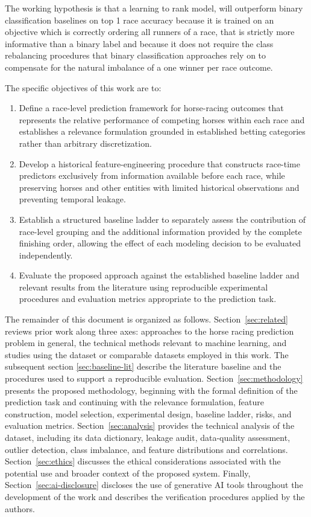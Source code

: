 The working hypothesis is that a learning to rank model, will outperform binary
classification baselines on top 1 race accuracy because it is trained on an objective
which is correctly ordering all runners of a race, that is strictly more informative
than a binary label and because it does not require the class rebalancing procedures
that binary classification approaches rely on to compensate for the natural imbalance
of a one winner per race outcome.

The specific objectives of this work are to:
\begin{enumerate}
    \item Define a race-level prediction framework for horse-racing
    outcomes that represents the relative performance of competing horses
    within each race and establishes a relevance formulation grounded in
    established betting categories rather than arbitrary discretization.

    \item Develop a historical feature-engineering procedure that
    constructs race-time predictors exclusively from information available
    before each race, while preserving horses and other entities with limited
    historical observations and preventing temporal leakage.

    \item Establish a structured baseline ladder to separately assess
    the contribution of race-level grouping and the additional information
    provided by the complete finishing order, allowing the effect of each
    modeling decision to be evaluated independently.

    \item Evaluate the proposed approach against the established
    baseline ladder and relevant results from the literature using reproducible
    experimental procedures and evaluation metrics appropriate to the
    prediction task.
\end{enumerate}

The remainder of this document is organized as follows. Section~\ref{sec:related}
reviews prior work along three axes: approaches to the horse racing prediction problem
in general, the technical methods relevant to machine learning, and studies using the
dataset or comparable datasets employed in this work. The subsequent section \ref{sec:baseline-lit}
describe the literature baseline and the procedures used to support a reproducible
evaluation. Section~\ref{sec:methodology} presents the proposed methodology, beginning
with the formal definition of the prediction task and continuing with the relevance
formulation, feature construction, model selection, experimental design, baseline
ladder, risks, and evaluation metrics. Section~\ref{sec:analysis} provides the
technical analysis of the dataset, including its data dictionary, leakage audit,
data-quality assessment, outlier detection, class imbalance, and feature distributions
and correlations. Section~\ref{sec:ethics} discusses the ethical considerations
associated with the potential use and broader context of the proposed system. Finally,
Section~\ref{sec:ai-disclosure} discloses the use of generative AI tools throughout the
development of the work and describes the verification procedures applied by the authors.